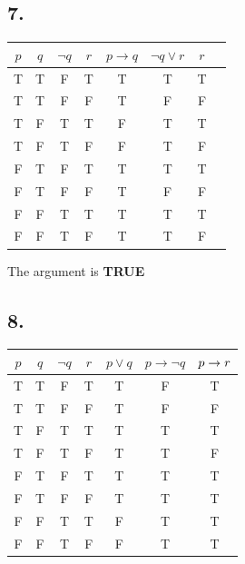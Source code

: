 \documentclass[a4paper, 10pt]{article}
\begin{document}
        \subsection*{7.}
            \begin{tabular}{|c|c|c|c|c|c|c|c|}
                \hline
                \cellcolor{yellow}$p$ & $q$ & $\neg q$ & \cellcolor{orange}$r$ & \cellcolor{yellow}$p \rightarrow q$ & \cellcolor{yellow}$\neg q \vee r$ & $r$ \\
                \hline
                \rowcolor{lightgray} T & T & F & T & T & T & T \\
                T & T & F & F & T & F & F \\
                T & F & T & T & F & T & T \\
                T & F & T & F & F & T & F \\
                F & T & F & T & T & T & T \\
                F & T & F & F & T & F & F \\
                F & F & T & T & T & T & T \\
                F & F & T & F & T & T & F \\
                \hline
            \end{tabular}

            The argument is \textbf{TRUE}

        \subsection*{8.}
            \begin{tabular}{|c|c|c|c|c|c|c|}
                \hline
                $p$ & $q$ & $\neg q$ & \cellcolor{orange}$r$ & \cellcolor{yellow}$p \vee q$ & \cellcolor{yellow}$p \rightarrow \neg q$ & $\cellcolor{yellow}p \rightarrow r$\\
                \hline
                T & T & F & T & T & F & T \\
                T & T & F & F & T & F & F \\
                \rowcolor{lightgray} T & F & T & T & T & T & T \\
                T & F & T & F & T & T & F \\
                \rowcolor{lightgray}  F & T & F & T & T & T & T \\
                \rowcolor{lightgray}  F & T & F & F & T & T & T \\
                F & F & T & T & F & T & T \\
                F & F & T & F & F & T & T \\
                \hline
            \end{tabular}
\end{document}
